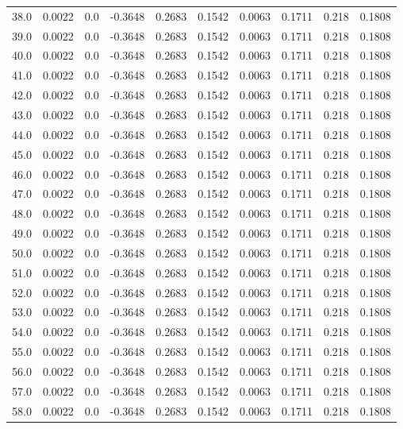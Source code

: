 \begin{longtable}{lrrrrrrrrr}
38.0 & 0.0022 & 0.0 & -0.3648 & 0.2683 & 0.1542 & 0.0063 & 0.1711 & 0.218 & 0.1808 \\
39.0 & 0.0022 & 0.0 & -0.3648 & 0.2683 & 0.1542 & 0.0063 & 0.1711 & 0.218 & 0.1808 \\
40.0 & 0.0022 & 0.0 & -0.3648 & 0.2683 & 0.1542 & 0.0063 & 0.1711 & 0.218 & 0.1808 \\
41.0 & 0.0022 & 0.0 & -0.3648 & 0.2683 & 0.1542 & 0.0063 & 0.1711 & 0.218 & 0.1808 \\
42.0 & 0.0022 & 0.0 & -0.3648 & 0.2683 & 0.1542 & 0.0063 & 0.1711 & 0.218 & 0.1808 \\
43.0 & 0.0022 & 0.0 & -0.3648 & 0.2683 & 0.1542 & 0.0063 & 0.1711 & 0.218 & 0.1808 \\
44.0 & 0.0022 & 0.0 & -0.3648 & 0.2683 & 0.1542 & 0.0063 & 0.1711 & 0.218 & 0.1808 \\
45.0 & 0.0022 & 0.0 & -0.3648 & 0.2683 & 0.1542 & 0.0063 & 0.1711 & 0.218 & 0.1808 \\
46.0 & 0.0022 & 0.0 & -0.3648 & 0.2683 & 0.1542 & 0.0063 & 0.1711 & 0.218 & 0.1808 \\
47.0 & 0.0022 & 0.0 & -0.3648 & 0.2683 & 0.1542 & 0.0063 & 0.1711 & 0.218 & 0.1808 \\
48.0 & 0.0022 & 0.0 & -0.3648 & 0.2683 & 0.1542 & 0.0063 & 0.1711 & 0.218 & 0.1808 \\
49.0 & 0.0022 & 0.0 & -0.3648 & 0.2683 & 0.1542 & 0.0063 & 0.1711 & 0.218 & 0.1808 \\
50.0 & 0.0022 & 0.0 & -0.3648 & 0.2683 & 0.1542 & 0.0063 & 0.1711 & 0.218 & 0.1808 \\
51.0 & 0.0022 & 0.0 & -0.3648 & 0.2683 & 0.1542 & 0.0063 & 0.1711 & 0.218 & 0.1808 \\
52.0 & 0.0022 & 0.0 & -0.3648 & 0.2683 & 0.1542 & 0.0063 & 0.1711 & 0.218 & 0.1808 \\
53.0 & 0.0022 & 0.0 & -0.3648 & 0.2683 & 0.1542 & 0.0063 & 0.1711 & 0.218 & 0.1808 \\
54.0 & 0.0022 & 0.0 & -0.3648 & 0.2683 & 0.1542 & 0.0063 & 0.1711 & 0.218 & 0.1808 \\
55.0 & 0.0022 & 0.0 & -0.3648 & 0.2683 & 0.1542 & 0.0063 & 0.1711 & 0.218 & 0.1808 \\
56.0 & 0.0022 & 0.0 & -0.3648 & 0.2683 & 0.1542 & 0.0063 & 0.1711 & 0.218 & 0.1808 \\
57.0 & 0.0022 & 0.0 & -0.3648 & 0.2683 & 0.1542 & 0.0063 & 0.1711 & 0.218 & 0.1808 \\
58.0 & 0.0022 & 0.0 & -0.3648 & 0.2683 & 0.1542 & 0.0063 & 0.1711 & 0.218 & 0.1808 \\

\end{longtable}

